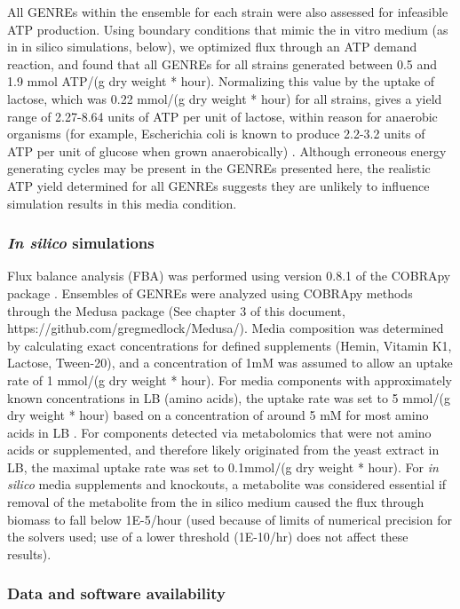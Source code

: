\documentclass[11pt,onecolumn,notitlepage,openany,twoside]{book}
\begin{document}
\begin{refsection}
All GENREs within the ensemble for each strain were also assessed for infeasible ATP production. Using boundary conditions that mimic the in vitro medium (as in in silico simulations, below), we optimized flux through an ATP demand reaction, and found that all GENREs for all strains generated between 0.5 and 1.9 mmol ATP/(g dry weight * hour). Normalizing this value by the uptake of lactose, which was 0.22 mmol/(g dry weight * hour) for all strains, gives a yield range of 2.27-8.64 units of ATP per unit of lactose, within reason for anaerobic organisms (for example, Escherichia coli is known to produce 2.2-3.2 units of ATP per unit of glucose when grown anaerobically) \cite{Muir1985-ft}. Although erroneous energy generating cycles may be present in the GENREs presented here, the realistic ATP yield determined for all GENREs suggests they are unlikely to influence simulation results in this media condition.

\subsubsection{\textit{In silico} simulations}

Flux balance analysis (FBA) was performed using version 0.8.1 of the COBRApy package \cite{Ebrahim2013-eb}. Ensembles of GENREs were analyzed using COBRApy methods through the Medusa package (See chapter 3 of this document, https://github.com/gregmedlock/Medusa/). Media composition was determined by calculating exact concentrations for defined supplements (Hemin, Vitamin K1, Lactose, Tween-20), and a concentration of 1mM was assumed to allow an uptake rate of 1 mmol/(g dry weight * hour). For media components with approximately known concentrations in LB (amino acids), the uptake rate was set to 5 mmol/(g dry weight * hour) based on a concentration of around 5 mM for most amino acids in LB \cite{Sezonov2007-hp}. For components detected via metabolomics that were not amino acids or supplemented, and therefore likely originated from the yeast extract in LB, the maximal uptake rate was set to 0.1mmol/(g dry weight * hour). For \textit{in silico} media supplements and knockouts, a metabolite was considered essential if removal of the metabolite from the in silico medium caused the flux through biomass to fall below 1E-5/hour (used because of limits of numerical precision for the solvers used; use of a lower threshold (1E-10/hr) does not affect these results).

\subsubsection{Data and software availability}


\end{refsection}
\end{document}
